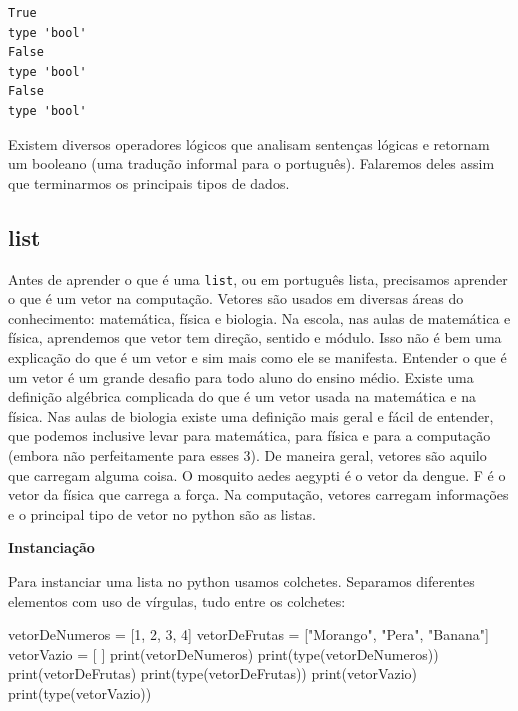 \documentclass[
  letterpaper,
  DIV=11,
  numbers=noendperiod]{scrreprt}
\newenvironment{Shaded}{\begin{snugshade}}{\end{snugshade}}
\newcommand{\BuiltInTok}[1]{\textcolor[rgb]{0.00,0.23,0.31}{#1}}
\newcommand{\DecValTok}[1]{\textcolor[rgb]{0.68,0.00,0.00}{#1}}
\newcommand{\NormalTok}[1]{\textcolor[rgb]{0.00,0.23,0.31}{#1}}
\newcommand{\OperatorTok}[1]{\textcolor[rgb]{0.37,0.37,0.37}{#1}}
\newcommand{\StringTok}[1]{\textcolor[rgb]{0.13,0.47,0.30}{#1}}
\begin{document}
\begin{tcolorbox}[enhanced jigsaw, breakable, leftrule=.75mm, left=2mm, opacityback=0, bottomrule=.15mm, toprule=.15mm, rightrule=.15mm, arc=.35mm, colback=white]

\begin{verbatim}
True
type 'bool'
False
type 'bool'
False
type 'bool'
\end{verbatim}

\end{tcolorbox}

Existem diversos operadores lógicos que analisam sentenças lógicas e
retornam um booleano (uma tradução informal para o português). Falaremos
deles assim que terminarmos os principais tipos de dados.

\hypertarget{list}{%
\subsection{list}\label{list}}

Antes de aprender o que é uma \texttt{list}, ou em português lista,
precisamos aprender o que é um vetor na computação. Vetores são usados
em diversas áreas do conhecimento: matemática, física e biologia. Na
escola, nas aulas de matemática e física, aprendemos que vetor tem
direção, sentido e módulo. Isso não é bem uma explicação do que é um
vetor e sim mais como ele se manifesta. Entender o que é um vetor é um
grande desafio para todo aluno do ensino médio. Existe uma definição
algébrica complicada do que é um vetor usada na matemática e na física.
Nas aulas de biologia existe uma definição mais geral e fácil de
entender, que podemos inclusive levar para matemática, para física e
para a computação (embora não perfeitamente para esses 3). De maneira
geral, vetores são aquilo que carregam alguma coisa. O mosquito aedes
aegypti é o vetor da dengue. F é o vetor da física que carrega a força.
Na computação, vetores carregam informações e o principal tipo de vetor
no python são as listas.

\textbf{Instanciação}

Para instanciar uma lista no python usamos colchetes. Separamos
diferentes elementos com uso de vírgulas, tudo entre os colchetes:

\begin{Shaded}
\begin{Highlighting}[]
\NormalTok{vetorDeNumeros }\OperatorTok{=}\NormalTok{ [}\DecValTok{1}\NormalTok{, }\DecValTok{2}\NormalTok{, }\DecValTok{3}\NormalTok{, }\DecValTok{4}\NormalTok{]}
\NormalTok{vetorDeFrutas }\OperatorTok{=}\NormalTok{ [}\StringTok{"Morango"}\NormalTok{, }\StringTok{"Pera"}\NormalTok{, }\StringTok{"Banana"}\NormalTok{]}
\NormalTok{vetorVazio }\OperatorTok{=}\NormalTok{ [ ]}
\BuiltInTok{print}\NormalTok{(vetorDeNumeros)}
\BuiltInTok{print}\NormalTok{(}\BuiltInTok{type}\NormalTok{(vetorDeNumeros))}
\BuiltInTok{print}\NormalTok{(vetorDeFrutas)}
\BuiltInTok{print}\NormalTok{(}\BuiltInTok{type}\NormalTok{(vetorDeFrutas))}
\BuiltInTok{print}\NormalTok{(vetorVazio)}
\BuiltInTok{print}\NormalTok{(}\BuiltInTok{type}\NormalTok{(vetorVazio))}
\end{Highlighting}
\end{Shaded}
\end{document}
